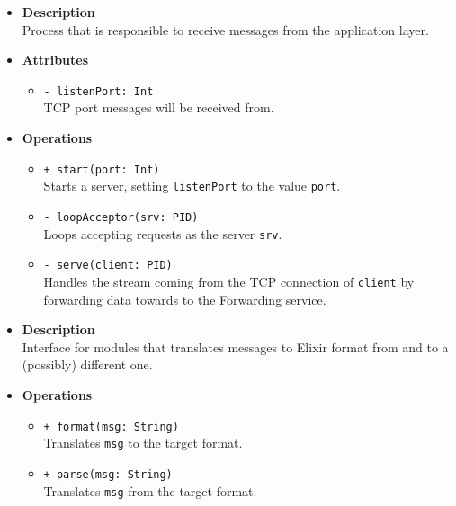 \FloatBarrier
\begin{itemize}
  \item \textbf{Description} \\
    Process that is responsible to receive messages from the application layer.
  \item \textbf{Attributes}
    \begin{itemize}
      \item \texttt{- listenPort: Int} \\
    TCP port messages will be received from.
    \end{itemize}
  \item \textbf{Operations}
  \begin{itemize}
    \item \texttt{+ start(port: Int)} \\
    Starts a server, setting \texttt{listenPort} to the value \texttt{port}.
    \item \texttt{- loopAcceptor(srv: PID)} \\
    Loops accepting requests as the server \texttt{srv}.
    \item \texttt{- serve(client: PID)} \\
    Handles the stream coming from the TCP connection of \texttt{client} by
    forwarding data towards to the Forwarding service.
  \end{itemize}
\end{itemize}

\FloatBarrier
\begin{itemize}
  \item \textbf{Description} \\
    Interface for modules that translates messages to Elixir format from and
    to a (possibly) different one.
  \item \textbf{Operations}
  \begin{itemize}
    \item \texttt{+ format(msg: String)} \\
    Translates \texttt{msg} to the target format.
    \item \texttt{+ parse(msg: String)} \\
    Translates \texttt{msg} from the target format.
  \end{itemize}
\end{itemize}

